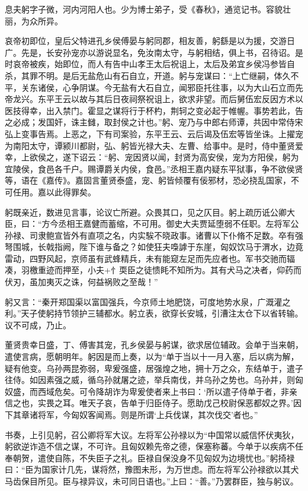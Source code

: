 \documentclass[12pt,UTF8]{ctexbook}
\begin{document}
息夫躬字子微，河内河阳人也。少为博士弟子，受《春秋》，通览记书。容貌壮丽，为众所异。



哀帝初即位，皇后父特进孔乡侯傅晏与躬同郡，相友善，躬繇是以为援，交游日广。先是，长安孙宠亦以游说显名，免汝南太守，与躬相结，俱上书，召待诏。是时哀帝被疾，始即位，而人有告中山孝王太后祝诅上，太后及弟宜乡侯冯参皆自杀，其罪不明。是后无盐危山有石自立，开道。躬与宠谋曰：“上亡继嗣，体久不平，关东诸侯，心争阴谋。今无盐有大石自立，闻邪臣托往事，以为大山石立而先帝龙兴。东平王云以故与其后日夜祠祭祝诅上，欲求非望。而后舅伍宏反因方术以医技得幸，出入禁门。霍显之谋将行于杯杓，荆轲之变必起于帷幄。事势若此，告之必成；发国奸，诛主雠，取封侯之计也。”躬、宠乃与中郎右师谭，共因中常侍宋弘上变事告焉。上恶之，下有司案验，东平王云、云后谒及伍宏等皆坐诛。上擢宠为南阳太守，谭颍川都尉，弘、躬皆光禄大夫、左曹、给事中。是时，侍中董贤爱幸，上欲侯之，遂下诏云：“躬、宠因贤以闻，封贤为高安侯，宠为方阳侯，躬为宜陵侯，食邑各千户。赐谭爵关内侯，食邑。”丞相王嘉内疑东平狱事，争不欲侯贤等，语在《嘉传》。嘉固言董贤泰盛，宠、躬皆倾覆有佞邪材，恐必挠乱国家，不可任用。嘉以此得罪矣。



躬既亲近，数进见言事，论议亡所避。众畏其口，见之仄目。躬上疏历诋公卿大臣，曰：“方今丞相王嘉健而蓄缩，不可用。御史大夫贾延堕弱不任职。左将军公孙禄、司隶鲍宣皆外有直项之名，内实騃不晓政事。诸曹以下仆脩不足数。卒有强弩围城，长戟指阙，陛下谁与备之？如使狂夫嘄謼于东崖，匈奴饮马于渭水，边竟雷动，四野风起，京师虽有武蜂精兵，未有能窥左足而先应者也。军书交驰而辐凑，羽檄重迹而押至，小夫+忄耎臣之徒愦眊不知所为。其有犬马之决者，仰药而伏刃，虽加夷灭之诛，何益祸败之至哉！”



躬又言：“秦开郑国渠以富国强兵，今京师土地肥饶，可度地势水泉，广溉灌之利。”天子使躬持节领护三辅都水。躬立表，欲穿长安城，引漕注太仓下以省转输。议不可成，乃止。



董贤贵幸日盛，丁、傅害其宠，孔乡侯晏与躬谋，欲求居位辅政。会单于当来朝，遣使言病，愿朝明年。躬因是而上奏，以为“单于当以十一月入塞，后以病为解，疑有他变。乌孙两昆弥弱，卑爰强盛，居强煌之地，拥十万之众，东结单于，遣子往侍。如因素强之威，循乌孙就屠之迹，举兵南伐，并乌孙之势也。乌孙并，则匈奴盛，而西域危矣。可令降胡诈为卑爰使者来上书曰：‘所以遣子侍单于者，非亲信之也，实畏之耳。唯天子哀，告单于归臣侍子。愿助戊己校尉保恶都奴之界。’因下其章诸将军，今匈奴客闻焉。则是所谓‘上兵伐谋，其次伐交’者也。”



书奏，上引见躬，召公卿将军大议。左将军公孙禄以为“中国常以威信怀伏夷狄，躬欲逆诈造不信之谋，不可许。且匈奴赖先帝之德，保塞称蕃。今单于以疾病不任奉朝贺，遣使自陈，不失臣子之礼。臣禄自保没身不见匈奴为边境忧也。”躬掎禄曰：“臣为国家计几先，谋将然，豫图未形，为万世虑。而左将军公孙禄欲以其犬马齿保目所见。臣与禄异议，未可同日语也。”上曰：“善。”乃罢群臣，独与躬议。
\end{document}
